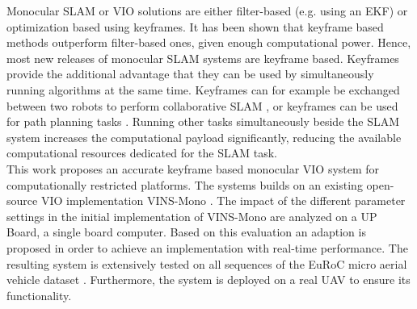 Monocular \ac{SLAM} or \ac{VIO} solutions are either filter-based (e.g. using an
\ac{EKF}) or optimization based using keyframes. It has been shown 
\citep{Strasdat2010} that keyframe based methods outperform filter-based ones, 
given enough computational power. Hence, most new releases of monocular 
\ac{SLAM} systems are keyframe based. Keyframes provide the additional 
advantage that they can be used by simultaneously running 
algorithms at the same time. Keyframes can for example be exchanged between two 
robots to perform collaborative \ac{SLAM} \citep{schmuck2017}, 
\citep{Karrer2018} or keyframes can be used for path planning tasks 
\citep{alzugaray2017short}. Running other tasks simultaneously beside the 
\ac{SLAM} system increases the computational payload significantly, reducing the 
available computational resources dedicated for the \ac{SLAM} task.\\

This work proposes an accurate keyframe based monocular \ac{VIO} system for 
computationally restricted platforms. The systems builds on an existing 
open-source \ac{VIO} implementation VINS-Mono \citep{Qin2017VINS}. The 
impact of the different parameter settings in the initial implementation of 
VINS-Mono are analyzed on a UP Board, a single board computer. 
Based on this evaluation an adaption is proposed in order to achieve an 
implementation with real-time performance. The resulting system is extensively
tested on all 
sequences of the EuRoC micro aerial vehicle dataset \citep{Burri2016EuRoC}. 
Furthermore, the system is deployed on a real \ac{UAV} to ensure its 
functionality. 

